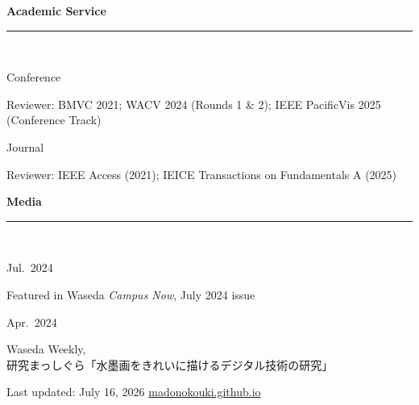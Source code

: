 \documentclass[10pt,a4paper]{article}
\newcommand{\jp}[1]{{\jpfont #1}}
\newcommand{\cvsection}[1]{%
  \vspace{9pt}%
  {\large\bfseries\color{accent}#1}\\[-9pt]
  {\color{lightblue}\rule{\textwidth}{0.9pt}}\\[2pt]%
}
\newcommand{\cvline}[2]{%
  \noindent\begin{minipage}[t]{3.15cm}\strut\small\color{mutedc}#1\end{minipage}%
  \hspace{0.3cm}%
  \begin{minipage}[t]{\dimexpr\textwidth-3.45cm\relax}\strut #2\end{minipage}\par\vspace{3.5pt}%
}
\begin{document}
\cvsection{Academic Service}
\cvline{Conference}{Reviewer: BMVC 2021; WACV 2024 (Rounds 1 \& 2); IEEE PacificVis 2025 (Conference Track)}
\cvline{Journal}{Reviewer: IEEE Access (2021); IEICE Transactions on Fundamentals A (2025)}

\cvsection{Media}
\cvline{Jul.~2024}{Featured in Waseda \textit{Campus Now}, July 2024 issue}
\cvline{Apr.~2024}{Waseda Weekly, \jp{研究まっしぐら「水墨画をきれいに描けるデジタル技術の研究」}}

\vspace{10pt}
{\small\color{mutedc}Last updated: July 16, 2026 \;\textbar\; \href{https://madonokouki.github.io}{madonokouki.github.io}}
\end{document}
